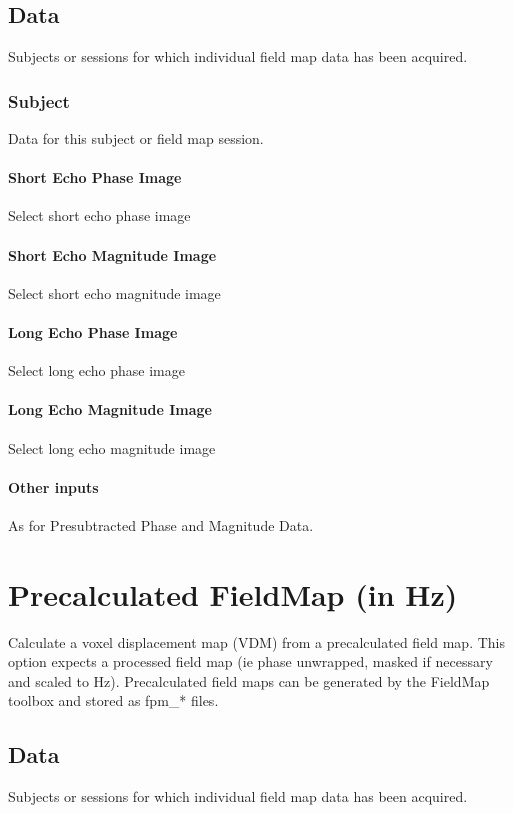 \subsection{Data}
Subjects or sessions for which individual field map data has been acquired.


\subsubsection{Subject}
Data for this subject or field map session.


\paragraph{Short Echo Phase Image}
Select short echo phase image


\paragraph{Short Echo Magnitude Image}
Select short echo magnitude image


\paragraph{Long Echo Phase Image}
Select long echo phase image


\paragraph{Long Echo Magnitude Image}
Select long echo magnitude image

\paragraph{Other inputs}
As for Presubtracted Phase and Magnitude Data.

\section{Precalculated FieldMap (in Hz)}
Calculate a voxel displacement map (VDM) from a precalculated field map. This option expects a processed field map (ie phase unwrapped, masked if necessary and scaled to Hz). Precalculated field maps can be generated by the FieldMap toolbox and stored as fpm\_* files.


\subsection{Data}
Subjects or sessions for which individual field map data has been acquired.


